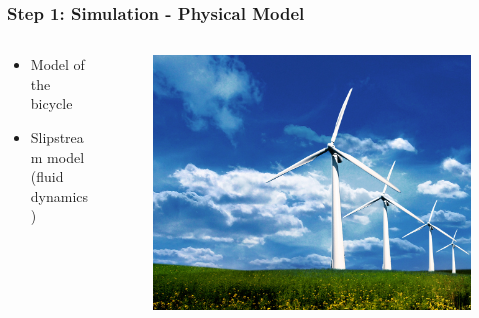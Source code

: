 \documentclass{beamer}
\begin{document}
\begin{frame}
\frametitle{Step 1: Simulation - Physical Model}

\begin{columns}
  \begin{column}{0.6\textwidth}
    \begin{itemize}
    \item Model of the bicycle
      \vspace{0.2cm}
    \item Slipstream model (fluid dynamics)
    \end{itemize}
  \end{column}
  
  \begin{column}{0.4\textwidth}
    \begin{figure}[ht!]
      \includegraphics[scale=0.1]{physical.jpg}
    \end{figure} 
  \end{column}
\end{columns}

\end{frame}
\end{document}
